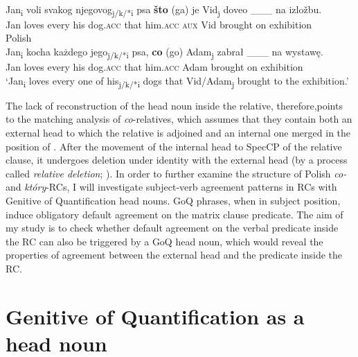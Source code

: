 \documentclass[output=paper]{langsci/langscibook}
\begin{document}
\ea%
    \label{ex:leska:16}
    \ea  {}\\
    \gll Jan\textsubscript{i}  voli   svakog   njegovog\textsubscript{j/k/*i} psa   \textbf{što} (ga)   je   Vid\textsubscript{j}  doveo \_\_\_   na izložbu.   \\
         Jan   loves every   his   dog.\textsc{acc}  that him.\textsc{acc} \textsc{aux}  Vid                               brought {}  on exhibition \\
    \ex  Polish\\
    \gll Jan\textsubscript{i} kocha   każdego   jego\textsubscript{j/k/*i} psa,   \textbf{co}  (go)     Adam\textsubscript{j}   zabrał \_\_\_     na wystawę.\\
         Jan  loves   every   his   dog.\textsc{acc}  that  him.\textsc{acc}  Adam     brought {}  on exhibition    \\
    \glt ‘Jan\textsubscript{i} loves every one of his\textsubscript{j/k/*i} dogs that Vid\slash Adam\textsubscript{j} brought to the exhibition.’
    \z
\z

The lack of reconstruction of the head noun inside the relative, therefore,\linebreak points to the matching analysis of \textit{co}{}-relatives, which assumes that they contain both an external head to which the relative is adjoined and an internal one merged in the position of  \citep{Bhatt2002,Sauerland2002,Hulsey2006}. After the movement of the internal head to SpecCP of the relative clause, it undergoes deletion under identity with the external head (by a process called \textit{relative deletion}; \citealt{Sauerland2002}). In order to further examine the structure of Polish \textit{co{}-} and \textit{który}{}-RCs, I will investigate subject-verb agreement patterns in RCs with Genitive of Quantification head nouns. GoQ phrases, when in subject position, induce obligatory default agreement on the matrix clause predicate. The aim of my study is to check whether default agreement on the verbal predicate inside the RC can also be triggered by a GoQ head noun, which would reveal the properties of agreement between the external head and the predicate inside the RC.

\section{Genitive of Quantification as a head noun} %
\end{document}
